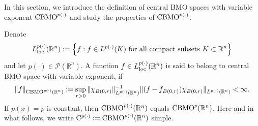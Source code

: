 \documentclass{amse-new}
\numberwithin{equation}{section} %
\begin{document}
In this section, we introduce the definition of central BMO spaces with variable exponent ${\rm CBMO}^{p(\cdot)}$ and study the properties of ${\rm CBMO}^{p(\cdot)}$.

Denote $$L^{p(\cdot)}_{\rm loc}(\mathbb{R}^n):=\Big\{f: f\in L^{p(\cdot)}(K) ~\text{for all compact subsets}~ K\subset \mathbb{R}^n\Big\}$$
and let $p(\cdot)\in \mathcal{P}(\mathbb{R}^n)$. A function $f\in L^{p(\cdot)}_{{\rm loc}}(\mathbb{R}^n)$ is said to belong to central {\rm BMO} space with variable exponent, if
$$\|f\|_{{\rm CBMO}^{p(\cdot)}(\mathbb{R}^n)}
:=\sup_{r>0}\|\chi_{B(0,r)}\|^{-1}_{L^{p(\cdot)}(\mathbb{R}^n)}\|(f-f_{B(0,r)})\chi_{B(0,r)}\|_{L^{p(\cdot)}(\mathbb{R}^n)}<\infty.$$
If $p(x)=p$ is constant, then ${\rm CBMO}^{p(\cdot)}(\mathbb{R}^n)$ equals ${\rm CBMO}^{p}(\mathbb{R}^n)$. Here and in what follows, we write ${\rm C}^{p(\cdot)}:={\rm CBMO}^{p(\cdot)}(\mathbb{R}^n)$ simple.
\vskip 0.2cm
\end{document}

